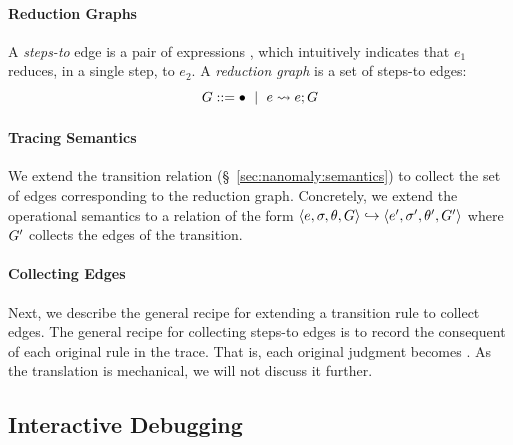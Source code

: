 \paragraph{Reduction Graphs}
%
A \emph{steps-to} edge is a pair of expressions , which
intuitively indicates that $e_1$ reduces, in a single step, to $e_2$.
%
%
A \emph{reduction graph} is a set of steps-to edges:
$$G ::= \bullet \ \mid\  e \leadsto e; G$$  %

\paragraph{Tracing Semantics}
%
We extend the transition relation (\S~\ref{sec:nanomaly:semantics}) to
collect the set of edges corresponding to the reduction graph.
%
Concretely, we extend the operational semantics to
a relation of the form $\langle e, \sigma, \theta, G \rangle \hookrightarrow \langle e', \sigma', \theta', G' \rangle$
where $G'$ collects the edges of the transition.

\paragraph{Collecting Edges}
%
Next, we describe the general recipe for extending a transition
rule to collect edges.
%
The general recipe for collecting steps-to edges is
to record the consequent of each original rule in the
trace. That is, each original judgment 
becomes .
%
As the translation is mechanical, we will not discuss it further.



\subsection{Interactive Debugging}
\label{sec:nanomaly:traversing-graph}

